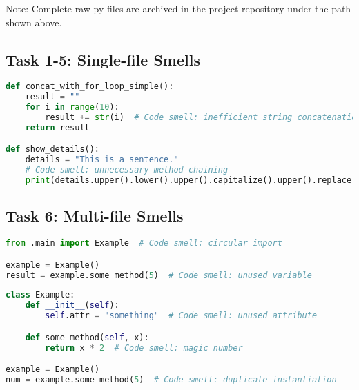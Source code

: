 \documentclass{article}
\begin{document}
\noindent
\footnotesize{Note: Complete raw py files are archived in the project repository under the path shown above.}


\subsection{Task 1-5: Single-file Smells}
\begin{lstlisting}[language=Python,caption={String Manipulation Smells (sample.py)},label=lst:task15]
def concat_with_for_loop_simple():
    result = ""
    for i in range(10):
        result += str(i)  # Code smell: inefficient string concatenation
    return result

def show_details():
    details = "This is a sentence."
    # Code smell: unnecessary method chaining
    print(details.upper().lower().upper().capitalize().upper().replace("|", "-"))
\end{lstlisting}

\subsection{Task 6: Multi-file Smells}
\begin{lstlisting}[language=Python,caption={Extra1 File (extra1.py)},label=lst:task6a]
from .main import Example  # Code smell: circular import

example = Example()
result = example.some_method(5)  # Code smell: unused variable
\end{lstlisting}

\begin{lstlisting}[language=Python,caption={DMain File (main.py)},label=lst:task6b]
class Example:
    def __init__(self):
        self.attr = "something"  # Code smell: unused attribute

    def some_method(self, x):
        return x * 2  # Code smell: magic number

example = Example()
num = example.some_method(5)  # Code smell: duplicate instantiation
\end{lstlisting}
\end{document}
